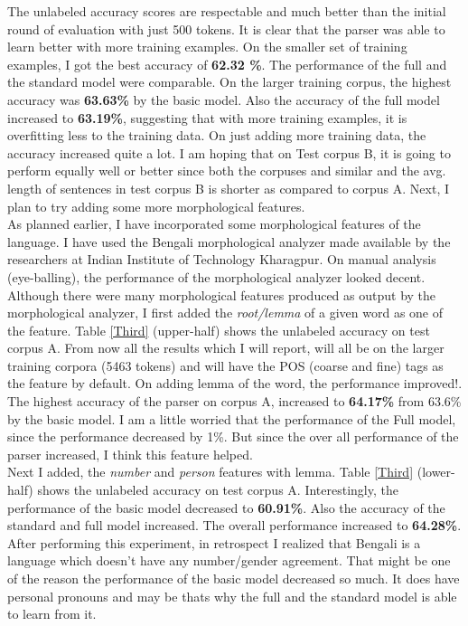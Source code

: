 \documentclass[11pt,letterpaper]{article}
\begin{document}
The unlabeled accuracy scores are respectable and much better than the initial round of evaluation with just 500 tokens. It is clear that the parser was able to learn better with more training examples. On the smaller set of training examples, I got the best accuracy of \textbf{62.32 \%}. The performance of the full and the standard model were comparable. On the larger training corpus, the highest accuracy was \textbf{63.63\%} by the basic model. Also the accuracy of the full model increased to \textbf{63.19\%}, suggesting that with more training examples, it is overfitting less to the training data. On just adding more training data, the accuracy increased quite a lot. I am hoping that on Test corpus B, it is going to perform equally well or better since both the corpuses and similar and the avg. length of sentences in test corpus B is shorter as compared to corpus A. Next, I plan to try adding some more morphological features.\\

As planned earlier, I have incorporated some morphological features of the language. I have used the Bengali morphological analyzer \citep{BMA} made available by the researchers at Indian Institute of Technology Kharagpur. On manual analysis (eye-balling), the performance of the morphological analyzer looked decent.  Although there were many morphological features produced as output by the morphological analyzer, I first added the \textit{root/lemma} of a given word as one of the feature.  Table \ref{Third} (upper-half) shows the unlabeled accuracy on test corpus A. From now all the results which I will report, will all be on the larger training corpora (5463 tokens) and will have the POS (coarse and fine) tags as the feature by default. On adding lemma of the word, the performance improved!. The highest accuracy of the parser on corpus A, increased to \textbf{64.17\%} from 63.6\% by the basic model. I am a little worried that the performance of the Full model, since the performance decreased by 1\%. But since the over all performance of the parser increased, I think this feature helped.\\

Next I added, the \textit{number} and \textit{person} features with lemma. Table \ref{Third} (lower-half) shows the unlabeled accuracy on test corpus A. Interestingly, the performance of the basic model decreased to \textbf{60.91\%}. Also the accuracy of the standard and full model increased. The overall performance increased to \textbf{64.28\%}. After performing this experiment, in retrospect I realized that Bengali is a language which doesn't have any number/gender agreement. That might be one of the reason the performance of the basic model decreased so much. It does have personal pronouns and may be thats why the full and the standard model is able to learn from it.\\
\end{document}
